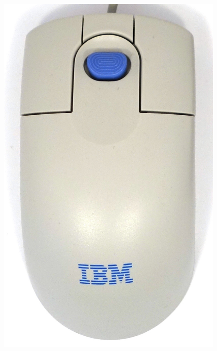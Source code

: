 \documentclass[11pt, a4paper]{article}
\begin{document}
\begin{figure}[h]
    \centering
    \includegraphics[scale=0.75]{2000_ibm_scrollpoint_ii_mouse/top_30.jpg}

\end{figure}
\end{document}
